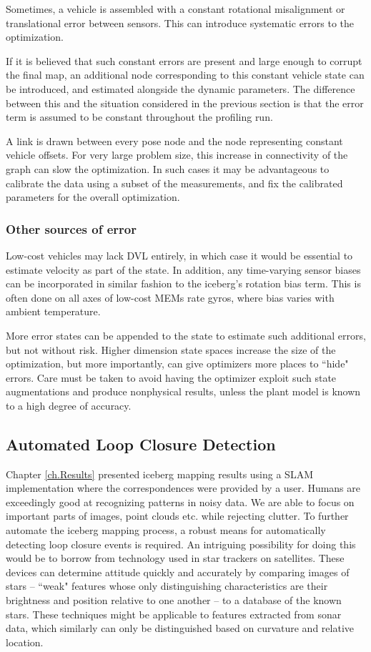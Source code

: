 Sometimes, a vehicle is assembled with a constant rotational misalignment or translational error between sensors. This can introduce systematic errors to the optimization.

If it is believed that such constant errors are present and large enough to corrupt the final map, an additional node corresponding to this constant vehicle state can be introduced, and estimated alongside the dynamic parameters. The difference between this and the situation considered in the previous section is that the error term is assumed to be constant throughout the profiling run. 

A link is drawn between every pose node and the node representing constant vehicle offsets. For very large problem size, this increase in connectivity of the graph can slow the optimization. In such cases it may be advantageous to calibrate the data using a subset of the measurements, and fix the calibrated parameters for the overall optimization. 

\subsubsection{Other sources of error}

Low-cost vehicles may lack DVL entirely, in which case it would be essential to estimate velocity as part of the state. In addition, any time-varying sensor biases can be incorporated in similar fashion to the iceberg's rotation bias term. This is often done on all axes of low-cost MEMs rate gyros, where bias varies with ambient temperature. 

More error states can be appended to the state to estimate such additional errors, but not without risk. Higher dimension state spaces increase the size of the optimization, but more importantly, can give optimizers more places to ``hide" errors. Care must be taken to avoid having the optimizer exploit such state augmentations and produce nonphysical results, unless the plant model is known to a high degree of accuracy.

\subsection{Automated Loop Closure Detection}
Chapter \ref{ch.Results} presented iceberg mapping results using a SLAM implementation where the correspondences were provided by a user. Humans are exceedingly good at recognizing patterns in noisy data. We are able to focus on important parts of images, point clouds etc. while rejecting clutter. To further automate the iceberg mapping process, a robust means for automatically detecting loop closure events is required. An intriguing possibility for doing this would be to borrow from technology used in star trackers on satellites. These devices can determine attitude quickly and accurately by comparing images of stars -- ``weak" features whose only distinguishing characteristics are their brightness and position relative to one another -- to a database of the known stars. These techniques might be applicable to features extracted from sonar data, which similarly can only be distinguished based on curvature and relative location. 

